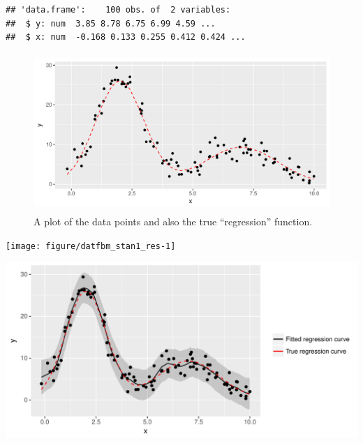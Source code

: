 \documentclass[english, 11pt]{article}
\begin{document}
\begin{knitrout}
\color{fgcolor}\begin{kframe}
\begin{verbatim}
## 'data.frame':	100 obs. of  2 variables:
##  $ y: num  3.85 8.78 6.75 6.99 4.59 ...
##  $ x: num  -0.168 0.133 0.255 0.412 0.424 ...
\end{verbatim}
\end{kframe}\begin{figure}

{\centering \includegraphics[width=\maxwidth,height=6cm]{figure/fbmsim-1} 

}

\caption[A plot of the data points and also the true ``regression'' function]{A plot of the data points and also the true ``regression'' function.}\label{fig:fbmsim}
\end{figure}


\end{knitrout}






\begin{knitrout}
\color{fgcolor}

{\centering \texttt{[image: figure/datfbm\_stan1\_res-1]} 

}




{\centering \includegraphics[width=\maxwidth]{figure/datfbm_stan1_res-2} 

}



\end{knitrout}
\end{document}

